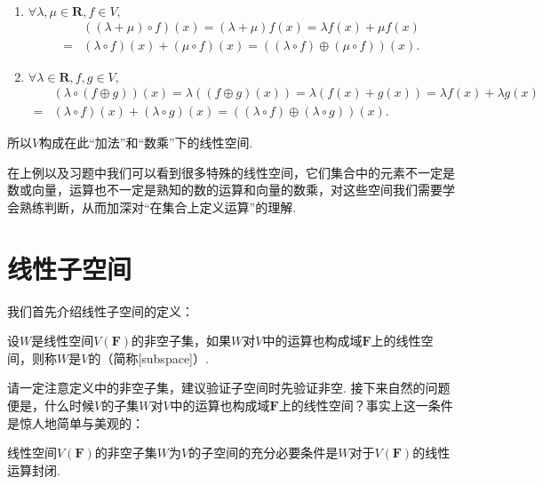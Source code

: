 \begin{solution}
\begin{enumerate}
\begin{enumerate}
                    \item $\forall \lambda, \mu \in \mathbf{R}, f \in V,$
                    \begin{align*}
                        & ((\lambda + \mu) \circ f)(x) = (\lambda + \mu)f(x) = \lambda f(x) + \mu f(x) \\ ={} & (\lambda \circ f)(x) + (\mu \circ f)(x) = ((\lambda \circ f) \oplus (\mu \circ f))(x).
                    \end{align*}

                    \item $\forall \lambda \in \mathbf{R}, f, g \in V,$
                    \begin{align*}
                        & (\lambda \circ (f \oplus g))(x) = \lambda((f \oplus g)(x)) = \lambda (f(x)+g(x)) = \lambda f(x) + \lambda g(x) \\ ={} & (\lambda \circ f)(x) + (\lambda \circ g)(x) = ((\lambda \circ f) \oplus (\lambda \circ g))(x).
                    \end{align*}
                \end{enumerate}
                所以$V$构成在此“加法”和“数乘”下的线性空间.
    \end{enumerate}
\end{solution}

在上例以及习题中我们可以看到很多特殊的线性空间，它们集合中的元素不一定是数或向量，运算也不一定是熟知的数的运算和向量的数乘，对这些空间我们需要学会熟练判断，从而加深对``在集合上定义运算''的理解.

\section{线性子空间}

我们首先介绍线性子空间的定义：
\begin{definition}
    设$W$是线性空间$V(\mathbf{F})$的非空子集，如果$W$对$V$中的运算也构成域$\mathbf{F}$上的线性空间，则称$W$是$V$的（简称[subspace]）.
\end{definition}

请一定注意定义中的非空子集，建议验证子空间时先验证非空. 接下来自然的问题便是，什么时候$V$的子集$W$对$V$中的运算也构成域$\mathbf{F}$上的线性空间？事实上这一条件是惊人地简单与美观的：
\begin{theorem}\label{thm:2:子空间判别}
    线性空间$V(\mathbf{F})$的非空子集$W$为$V$的子空间的充分必要条件是$W$对于$V(\mathbf{F})$的线性运算封闭.
\end{theorem}

